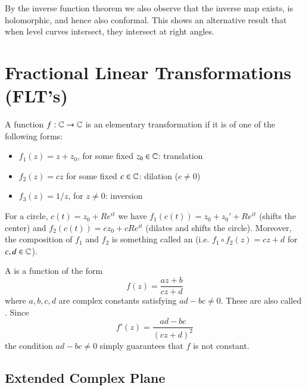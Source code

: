 By the inverse function theorem we also observe that the inverse map exists, is holomorphic, and hence also conformal. This shows an alternative result that when level curves intersect, they intersect at right angles.




\section{Fractional Linear Transformations (FLT's)}

\begin{definition}
    A function $f:\mathbb C\rightarrow \mathbb C$ is an elementary transformation if it is of one of the following forms: \begin{itemize}
        \item $f_1(z) = z+z_0$, for some fixed $z_0 \in \mathbb C$: translation
        \item $f_2(z) = cz$ for some fixed $c \in \mathbb C$: dilation ($c\neq 0$)
        \item $f_3(z) = 1/z$, for $z \neq 0$: inversion
    \end{itemize}
\end{definition}

For a circle, $c(t) = z_0+Re^{it}$ we have $f_1(c(t)) = z_0+z_0'+Re^{it}$ (shifts the center) and $f_2(c(t)) = cz_0+cRe^{it}$ (dilates and shifts the circle). Moreover, the composition of $f_1$ and $f_2$ is something called an  (i.e. $f_1\circ f_2(z) = cz+d$ for $c,d \in \mathbb C$).

\begin{definition}
    A  is a function of the form \begin{equation*}
        f(z) = \frac{az+b}{cz+d}
    \end{equation*}
    where $a,b,c,d$ are complex constants satisfying $ad-bc \neq 0$. These are also called . Since \begin{equation*}
        f'(z) = \frac{ad-bc}{(cz+d)^2}
    \end{equation*}
    the condition $ad-bc \neq 0$ simply guarantees that $f$ is not constant.
\end{definition}


\subsection{Extended Complex Plane}

